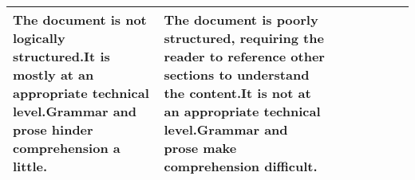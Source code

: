 \documentclass{csse4400}
\begin{document}
\begin{landscape}
\begin{xltabular}{\linewidth}{| p{2cm} | X | X | X | X | X | X | X |}
The document is not logically structured.\newline\newline\newline\newline It is mostly at an appropriate technical level.\newline\newline Grammar and prose hinder comprehension a little. &
The document is poorly structured, requiring the reader to reference other sections to understand the content.\newline\newline It is not at an appropriate technical level.\newline\newline Grammar and prose make comprehension difficult. \\
\hline
\end{xltabular}

\end{landscape}
\end{document}
